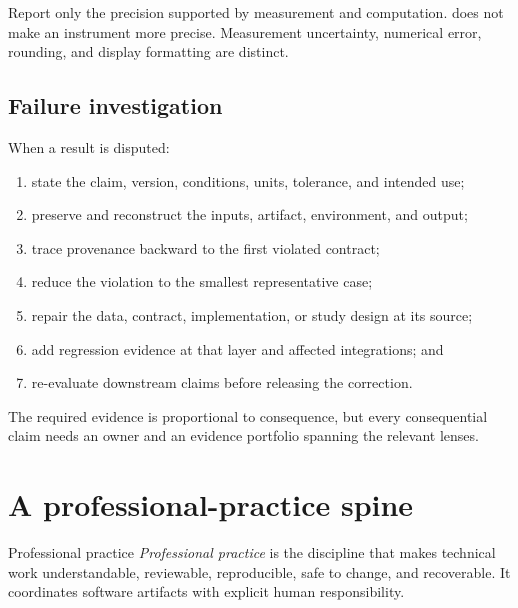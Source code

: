 \begin{professionalbox}
Report only the precision supported by measurement and computation.
 does not make an instrument more precise. Measurement
uncertainty, numerical error, rounding, and display formatting are distinct.
\end{professionalbox}

\subsection{Failure investigation}

When a result is disputed:

\begin{enumerate}
  \item state the claim, version, conditions, units, tolerance, and intended use;
  \item preserve and reconstruct the inputs, artifact, environment, and output;
  \item trace provenance backward to the first violated contract;
  \item reduce the violation to the smallest representative case;
  \item repair the data, contract, implementation, or study design at its source;
  \item add regression evidence at that layer and affected integrations; and
  \item re-evaluate downstream claims before releasing the correction.
\end{enumerate}

The required evidence is proportional to consequence, but every consequential
claim needs an owner and an evidence portfolio spanning the relevant lenses.


\section{A professional-practice spine}

\begin{definitionbox}{Professional practice}
\emph{Professional practice} is the discipline that makes technical work
understandable, reviewable, reproducible, safe to change, and recoverable. It
coordinates software artifacts with explicit human responsibility.
\end{definitionbox}

